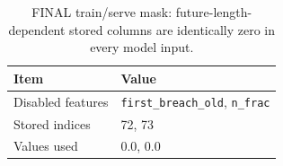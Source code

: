 \begin{table}
  \centering
  \caption{FINAL train/serve mask: future-length-dependent stored columns are identically zero in every model input.}
  \label{tab:final_mask}
  \begin{tabular}{ll}
    \toprule
    Item & Value \\
    \midrule
    Disabled features & \texttt{first_breach_old}, \texttt{n_frac} \\
    Stored indices & 72, 73 \\
    Values used & 0.0, 0.0 \\
    \bottomrule
  \end{tabular}
\end{table}
